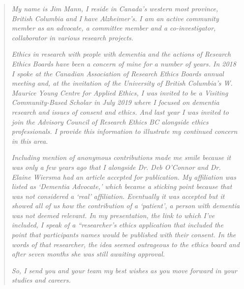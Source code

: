\begin{quote}
\textit{My name is Jim Mann, I reside in Canada’s western most province, British Columbia and I have Alzheimer's. I am an active community member as an advocate, a committee member and a co-investigator, collaborator in various research projects.} 

\textit{Ethics in research with people with dementia and the actions of Research Ethics Boards have been a concern of mine for a number of years. In 2018 I spoke at the Canadian Association of Research Ethics Boards annual meeting and, at the invitation of the University of British Columbia’s W. Maurice Young Centre for Applied Ethics, I was invited to be a Visiting Community-Based Scholar in July 2019 where I focused on dementia research and issues of consent and ethics. And last year I was invited to join the Advisory Council of Research Ethics BC alongside ethics professionals. I provide this information to illustrate my continued concern in this area.
} 

\textit{Including mention of anonymous contributions made me smile because it was only a few years ago that I alongside Dr. Deb O’Connor and Dr. Elaine Wiersma had an article accepted for publication. My affiliation was listed as ‘Dementia Advocate,’ which became a sticking point because that was not considered a ‘real’ affiliation. Eventually it was accepted but it showed all of us how the contribution of a ‘patient’, a person with dementia was not deemed relevant. In my presentation, the link to which I’ve included, I speak of a “researcher’s ethics application that included the point that participants names would be published with their consent. In the words of that researcher, the idea seemed outrageous to the ethics board and after seven months she was still awaiting approval.
} 

\textit{So, I send you and your team my best wishes as you move forward in your studies and careers.
}
\end{quote}


